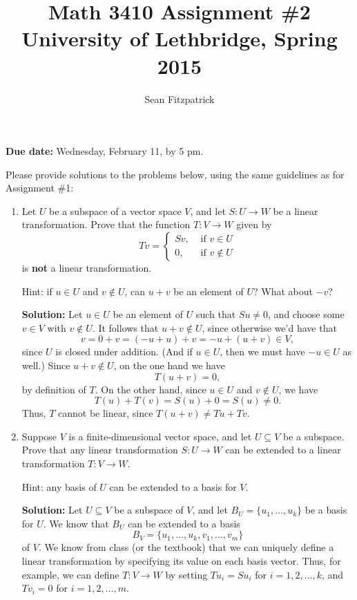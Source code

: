 \documentclass[letterpaper,12pt]{article}
\title{Math 3410 Assignment \#2\\University of Lethbridge, Spring 2015}
\author{Sean Fitzpatrick}
\begin{document}
 \maketitle

{\bf Due date:} Wednesday, February 11, by 5 pm.

\bigskip

Please provide solutions to the problems below, using the same guidelines as for Assignment \#1:


\begin{enumerate}
 \item Let $U$ be a subspace of a vector space $V$, and let $S:U\to W$ be a linear transformation. Prove that the function $T:V\to W$ given by
\[
 Tv = \begin{cases}Sv, &\text{ if } v\in U\\ 0, &\text{ if } v\notin U\end{cases}
\]
is {\bf not} a linear transformation.

Hint: if $u\in U$ and $v\notin U$, can $u+v$ be an element of $U$? What about $-v$?

\bigskip

{\bf Solution:} Let $u\in U$ be an element of $U$ such that $Su\neq 0$, and choose some $v\in V$ with $v\notin U$. It follows that $u+v\notin U$, since otherwise we'd have that
\[
 v = 0+v = (-u+u)+v = -u+(u+v)\in V,
\]
since $U$ is closed under addition. (And if $u\in U$, then we must have $-u\in U$ as well.)  Since $u+v\notin U$, on the one hand we have
\[
 T(u+v) = 0,
\]
by definition of $T$. On the other hand, since $u\in U$ and $v\notin U$, we have
\[
 T(u)+T(v) = S(u) + 0 = S(u)\neq 0.
\]
Thus, $T$ cannot be linear, since $T(u+v)\neq Tu+Tv$.


\bigskip

 \item Suppose $V$ is a finite-dimensional vector space, and let $U\subseteq V$ be a subspace. Prove that any linear transformation $S:U\to W$ can be extended to a linear transformation $T:V\to W$.

Hint: any basis of $U$ can be extended to a basis for $V$. 

\bigskip

{\bf Solution:} Let $U\subseteq V$ be a subspace of $V$, and let $B_U=\{u_1,\ldots, u_k\}$ be a basis for $U$. We know that $B_U$ can be extended to a basis
\[
 B_V = \{u_1,\ldots, u_k,v_1,\ldots, v_m\}
\]
of $V$. We know from class (or the textbook) that we can uniquely define a linear transformation by specifying its value on each basis vector. Thus, for example, we can define $T:V\to W$ by setting $Tu_i = Su_i$ for $i=1,2,\ldots, k$, and $Tv_i = 0$ for $i=1,2,\ldots, m$.


\end{enumerate}
\end{document}
